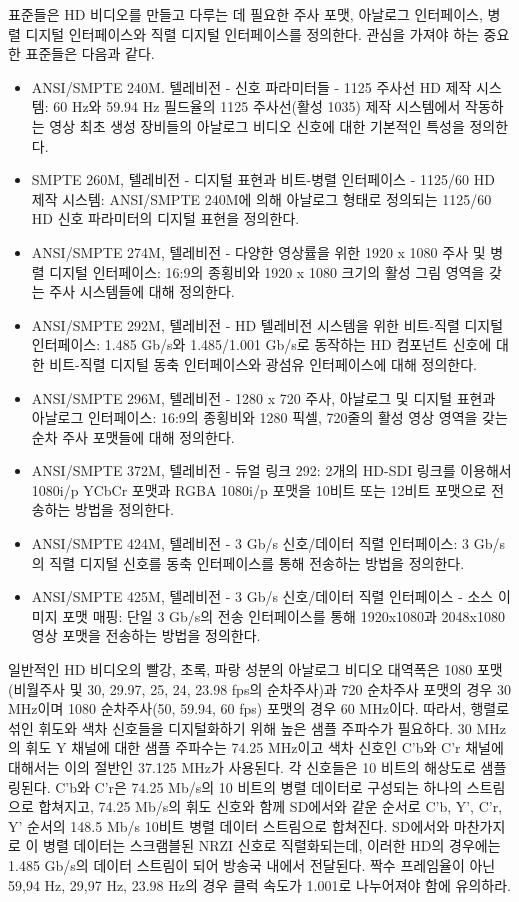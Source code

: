 표준들은 HD 비디오를 만들고 다루는 데 필요한 주사 포맷, 아날로그 인터페이스, 병렬 디지털 인터페이스와 직렬 디지털 인터페이스를 정의한다. 관심을 가져야 하는 중요한 표준들은 다음과 같다.
\begin{itemize}
    \item ANSI/SMPTE 240M. 텔레비전 - 신호 파라미터들 - 1125 주사선 HD 제작 시스템: 60 Hz와 59.94 Hz 필드율의 1125 주사선(활성 1035) 제작 시스템에서 작동하는 영상 최초 생성 장비들의 아날로그 비디오 신호에 대한 기본적인 특성을 정의한다.
    \item SMPTE 260M, 텔레비전 - 디지털 표현과 비트-병렬 인터페이스 - 1125/60 HD 제작 시스템: ANSI/SMPTE 240M에 의해 아날로그 형태로 정의되는 1125/60 HD 신호 파라미터의 디지털 표현을 정의한다.
    \item ANSI/SMPTE 274M, 텔레비전 - 다양한 영상률을 위한 1920 x 1080 주사 및 병렬 디지털 인터페이스: 16:9의 종횡비와 1920 x 1080 크기의 활성 그림 영역을 갖는 주사 시스템들에 대해 정의한다.
    \item ANSI/SMPTE 292M, 텔레비전 - HD 텔레비전 시스템을 위한 비트-직렬 디지털 인터페이스: 1.485 Gb/s와 1.485/1.001 Gb/s로 동작하는 HD 컴포넌트 신호에 대한 비트-직렬 디지털 동축 인터페이스와 광섬유 인터페이스에 대해 정의한다.
    \item ANSI/SMPTE 296M, 텔레비전 - 1280 x 720 주사, 아날로그 및 디지털 표현과 아날로그 인터페이스: 16:9의 종횡비와 1280 픽셀, 720줄의 활성 영상 영역을 갖는 순차 주사 포맷들에 대해 정의한다.
    \item ANSI/SMPTE 372M, 텔레비전 - 듀얼 링크 292: 2개의 HD-SDI 링크를 이용해서 1080i/p YCbCr 포맷과 RGBA 1080i/p 포맷을 10비트 또는 12비트 포맷으로 전송하는 방법을 정의한다.
    \item ANSI/SMPTE 424M, 텔레비전 - 3 Gb/s 신호/데이터 직렬 인터페이스: 3 Gb/s의 직렬 디지털 신호를 동축 인터페이스를 통해 전송하는 방법을 정의한다.
    \item ANSI/SMPTE 425M, 텔레비전 - 3 Gb/s 신호/데이터 직렬 인터페이스 - 소스 이미지 포맷 매핑: 단일 3 Gb/s의 전송 인터페이스를 통해 1920x1080과 2048x1080 영상 포맷을 전송하는 방법을 정의한다.
\end{itemize}


일반적인 HD 비디오의 빨강, 초록, 파랑 성분의 아날로그 비디오 대역폭은 1080 포맷(비월주사 및  30, 29.97, 25, 24, 23.98 fps의 순차주사)과 720 순차주사 포맷의 경우 30 MHz이며 1080 순차주사(50, 59.94, 60 fps) 포맷의 경우 60 MHz이다.
따라서, 행렬로 섞인 휘도와 색차 신호들을 디지털화하기 위해 높은 샘플 주파수가 필요하다. 30 MHz의 휘도 Y 채널에 대한 샘플 주파수는 74.25 MHz이고 색차 신호인 C'b와 C'r 채널에 대해서는 이의 절반인 37.125 MHz가 사용된다.
각 신호들은 10 비트의 해상도로 샘플링된다. C'b와 C'r은 74.25 Mb/s의 10 비트의 병렬 데이터로 구성되는 하나의 스트림으로 합쳐지고, 74.25 Mb/s의 휘도 신호와 함께 SD에서와 같운 순서로 C'b, Y', C'r, Y' 순서의 148.5 Mb/s 10비트 병렬 데이터 스트림으로 합쳐진다.
SD에서와 마찬가지로 이 병렬 데이터는 스크램블된 NRZI 신호로 직렬화되는데, 이러한 HD의 경우에는 1.485 Gb/s의 데이터 스트림이 되어 방송국 내에서 전달된다. 짝수 프레임율이 아닌 59,94 Hz, 29,97 Hz, 23.98 Hz의 경우 클럭 속도가 1.001로 나누어져야 함에 유의하라.

